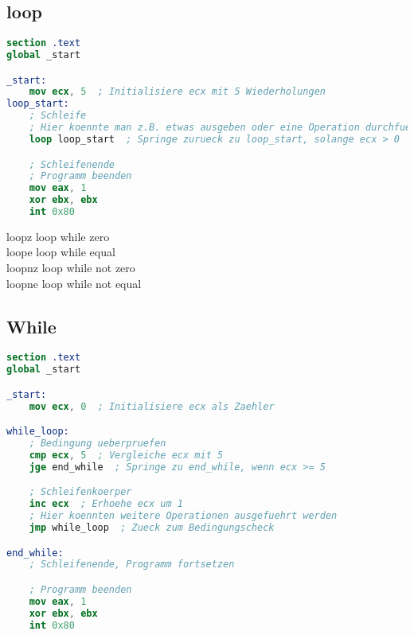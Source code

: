 \documentclass[a4paper,12pt,twoside]{article}
\begin{document}
\subsection{loop}
\begin{center}
  \begin{minipage}{1.0\textwidth}
    \begin{lstlisting}[language=NASM]
section .text
global _start

_start:
    mov ecx, 5  ; Initialisiere ecx mit 5 Wiederholungen
loop_start:
    ; Schleife
    ; Hier koennte man z.B. etwas ausgeben oder eine Operation durchfuehren
    loop loop_start  ; Springe zurueck zu loop_start, solange ecx > 0

    ; Schleifenende
    ; Programm beenden
    mov eax, 1
    xor ebx, ebx
    int 0x80
    \end{lstlisting}
  \end{minipage}
\end{center}
\hspace{2mm} loopz \hspace{50mm} loop while zero \\ 
\hspace{2mm} loope \hspace{50mm} loop while equal \\ 
\hspace{2mm} loopnz \hspace{50mm} loop while not zero \\ 
\hspace{2mm} loopne \hspace{50mm} loop while not equal \\ 
\subsection{While}
\begin{center}
  \begin{minipage}{1.0\textwidth}
    \begin{lstlisting}[language=NASM]
section .text
global _start

_start:
    mov ecx, 0  ; Initialisiere ecx als Zaehler

while_loop:
    ; Bedingung ueberpruefen
    cmp ecx, 5  ; Vergleiche ecx mit 5
    jge end_while  ; Springe zu end_while, wenn ecx >= 5

    ; Schleifenkoerper
    inc ecx  ; Erhoehe ecx um 1
    ; Hier koennten weitere Operationen ausgefuehrt werden
    jmp while_loop  ; Zueck zum Bedingungscheck

end_while:
    ; Schleifenende, Programm fortsetzen

    ; Programm beenden
    mov eax, 1
    xor ebx, ebx
    int 0x80
    \end{lstlisting}
  \end{minipage}
\end{center}
\end{document}
